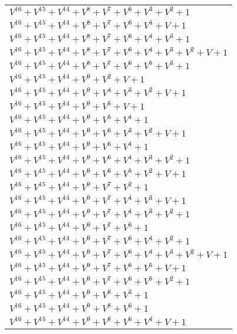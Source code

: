 \documentclass[12pt]{article}
\begin{document}
\begin{adjustwidth}{-4cm}{}
\begin{center}
\begin{longtable}{|l|}
$V^{16}  +V^{15}  +V^{14}  +V^{8}  +V^{7}  +V^{6}  +V^{3}  +V^{2}  + 1$ \\
$V^{16}  +V^{15}  +V^{14}  +V^{8}  +V^{7}  +V^{6}  +V^{4}  + V + 1$ \\
$V^{16}  +V^{15}  +V^{14}  +V^{8}  +V^{7}  +V^{6}  +V^{4}  +V^{3}  + 1$ \\
$V^{16}  +V^{15}  +V^{14}  +V^{8}  +V^{7}  +V^{6}  +V^{4}  +V^{3}  +V^{2}  + V + 1$ \\
$V^{16}  +V^{15}  +V^{14}  +V^{8}  +V^{7}  +V^{6}  +V^{5}  +V^{3}  + 1$ \\
$V^{16}  +V^{15}  +V^{14}  +V^{9}  +V^{2}  + V + 1$ \\
$V^{16}  +V^{15}  +V^{14}  +V^{9}  +V^{4}  +V^{3}  +V^{2}  + V + 1$ \\
$V^{16}  +V^{15}  +V^{14}  +V^{9}  +V^{5}  + V + 1$ \\
$V^{16}  +V^{15}  +V^{14}  +V^{9}  +V^{5}  +V^{4}  + 1$ \\
$V^{16}  +V^{15}  +V^{14}  +V^{9}  +V^{6}  +V^{3}  +V^{2}  + V + 1$ \\
$V^{16}  +V^{15}  +V^{14}  +V^{9}  +V^{6}  +V^{4}  + 1$ \\
$V^{16}  +V^{15}  +V^{14}  +V^{9}  +V^{6}  +V^{4}  +V^{3}  +V^{2}  + 1$ \\
$V^{16}  +V^{15}  +V^{14}  +V^{9}  +V^{6}  +V^{5}  +V^{2}  + V + 1$ \\
$V^{16}  +V^{15}  +V^{14}  +V^{9}  +V^{7}  +V^{2}  + 1$ \\
$V^{16}  +V^{15}  +V^{14}  +V^{9}  +V^{7}  +V^{4}  +V^{3}  + V + 1$ \\
$V^{16}  +V^{15}  +V^{14}  +V^{9}  +V^{7}  +V^{4}  +V^{3}  +V^{2}  + 1$ \\
$V^{16}  +V^{15}  +V^{14}  +V^{9}  +V^{7}  +V^{6}  + 1$ \\
$V^{16}  +V^{15}  +V^{14}  +V^{9}  +V^{7}  +V^{6}  +V^{4}  +V^{2}  + 1$ \\
$V^{16}  +V^{15}  +V^{14}  +V^{9}  +V^{7}  +V^{6}  +V^{4}  +V^{3}  +V^{2}  + V + 1$ \\
$V^{16}  +V^{15}  +V^{14}  +V^{9}  +V^{7}  +V^{6}  +V^{5}  + V + 1$ \\
$V^{16}  +V^{15}  +V^{14}  +V^{9}  +V^{7}  +V^{6}  +V^{5}  +V^{2}  + 1$ \\
$V^{16}  +V^{15}  +V^{14}  +V^{9}  +V^{8}  +V^{3}  + 1$ \\
$V^{16}  +V^{15}  +V^{14}  +V^{9}  +V^{8}  +V^{6}  + 1$ \\
$V^{16}  +V^{15}  +V^{14}  +V^{9}  +V^{8}  +V^{6}  +V^{4}  + V + 1$ \\

\end{longtable}
\end{center}
\end{adjustwidth}
\end{document}
